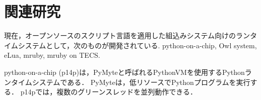 \documentclass[submit,techrep]{ipsj}
\begin{document}
\section{関連研究}
\vspace{-2mm}
\label{sec:Related Work}
現在，オープンソースのスクリプト言語を適用した組込みシステム向けのランタイムシステムとして，次のものが開発されている.
python-on-a-chip\cite{url:python-on-a-chip}, Owl system\cite{par:owl}, eLua\cite{url:eLua}, mruby\cite{par:mruby}, mruby on TECS\cite{par:mrubyonTECS}.

python-on-a-chip (p14p)は，PyMyteと呼ばれるPythonVMを使用するPythonランタイムシステムである．
PyMyteは，低リソースでPythonプログラムを実行する．
p14pでは，複数のグリーンスレッドを並列動作できる．
\end{document}
